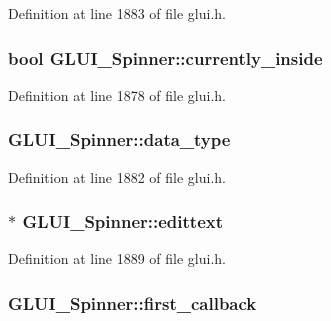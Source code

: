 Definition at line 1883 of file glui.\+h.

\hypertarget{class_g_l_u_i___spinner_aed4644e2decbc62c45c48d6cd600ecbc}{
\subsubsection[{currently\+\_\+inside}]{\setlength{\rightskip}{0pt plus 5cm}bool G\+L\+U\+I\+\_\+\+Spinner\+::currently\+\_\+inside}}\label{class_g_l_u_i___spinner_aed4644e2decbc62c45c48d6cd600ecbc}


Definition at line 1878 of file glui.\+h.

\hypertarget{class_g_l_u_i___spinner_a821f0e5b5f040f93f53ee7441abfc44e}{
\subsubsection[{data\+\_\+type}]{ G\+L\+U\+I\+\_\+\+Spinner\+::data\+\_\+type}}\label{class_g_l_u_i___spinner_a821f0e5b5f040f93f53ee7441abfc44e}


Definition at line 1882 of file glui.\+h.

\hypertarget{class_g_l_u_i___spinner_a708461cddff3603041cf95a1935a64d0}{
\subsubsection[{edittext}]{$\ast$ G\+L\+U\+I\+\_\+\+Spinner\+::edittext}}\label{class_g_l_u_i___spinner_a708461cddff3603041cf95a1935a64d0}


Definition at line 1889 of file glui.\+h.

\hypertarget{class_g_l_u_i___spinner_ae16da3f5d44b51089a85ce900b5369c8}{
\subsubsection[{first\+\_\+callback}]{ G\+L\+U\+I\+\_\+\+Spinner\+::first\+\_\+callback}}\label{class_g_l_u_i___spinner_ae16da3f5d44b51089a85ce900b5369c8}


